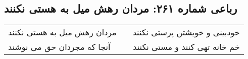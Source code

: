 \begin{center}
\section*{رباعی شماره ۲۶۱: مردان رهش میل به هستی نکنند}
\label{sec:sh261}
\begin{longtable}{l p{0.5cm} r}
مردان رهش میل به هستی نکنند
&&
خودبینی و خویشتن پرستی نکنند
\\
آنجا که مجردان حق می نوشند
&&
خم خانه تهی کنند و مستی نکنند
\\
\end{longtable}
\end{center}
